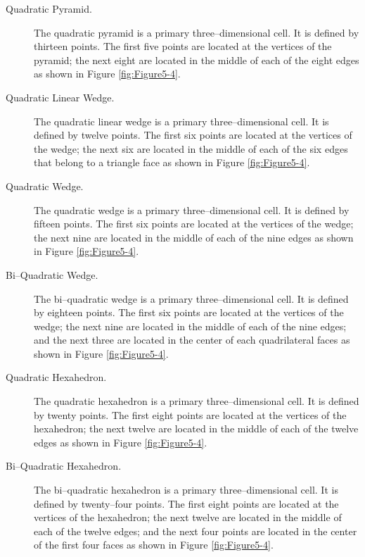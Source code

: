 \begin{description}
\item[Quadratic Pyramid.] The quadratic pyramid is a primary three--dimensional cell. It is defined by thirteen points. The first five points are located at the vertices of the pyramid; the next eight are located in the middle of each of the eight edges as shown in Figure \ref{fig:Figure5-4}.

\item[Quadratic Linear Wedge.] The quadratic linear wedge is a primary three--dimensional cell. It is defined by twelve points. The first six points are located at the vertices of the wedge; the next six are located in the middle of each of the six edges that belong to a triangle face as shown in Figure \ref{fig:Figure5-4}.

\item[Quadratic Wedge.] The quadratic wedge is a primary three--dimensional cell. It is defined by fifteen points. The first six points are located at the vertices of the wedge; the next nine are located in the middle of each of the nine edges as shown in Figure \ref{fig:Figure5-4}.

\item[Bi--Quadratic Wedge.] The bi--quadratic wedge is a primary three--dimensional cell. It is defined by eighteen points. The first six points are located at the vertices of the wedge; the next nine are located in the middle of each of the nine edges; and the next three are located in the center of each quadrilateral faces as shown in Figure \ref{fig:Figure5-4}.

\item[Quadratic Hexahedron.] The quadratic hexahedron is a primary three--dimensional cell. It is defined by twenty points. The first eight points are located at the vertices of the hexahedron; the next twelve are located in the middle of each of the twelve edges as shown in Figure \ref{fig:Figure5-4}.

\item[Bi--Quadratic Hexahedron.] The bi--quadratic hexahedron is a primary three--dimensional cell. It is defined by twenty--four points. The first eight points are located at the vertices of the hexahedron; the next twelve are located in the middle of each of the twelve edges; and the next four points are located in the center of the first four faces as shown in Figure \ref{fig:Figure5-4}.


\end{description}
